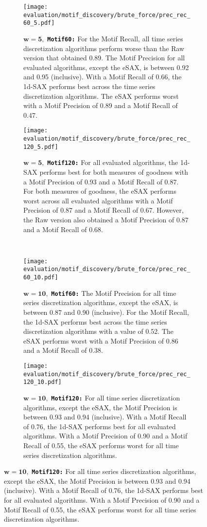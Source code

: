 \begin{figure}[H]
\centering
\begin{subfigure}[t]{0.45\textwidth}
\texttt{[image: evaluation/motif\_discovery/brute\_force/prec\_rec\_60\_5.pdf]}
\caption{$\mathbf{w = 5},$ \texttt{\textbf{Motif60:}} For the Motif Recall, all time series discretization algorithms perform worse than the Raw version that obtained 0.89. The Motif Precision for all evaluated algorithms, except the \ac{eSAX}, is between 0.92 and 0.95 (inclusive). With a Motif Recall of 0.66, the \ac{1d-SAX} performs best across the time series discretization algorithms. The \ac{eSAX} performs worst with a Motif Precision of 0.89 and a Motif Recall of 0.47.}
\label{fig:bf_60_10}
\end{subfigure}
\hfill%
\begin{subfigure}[t]{0.45\textwidth}
\texttt{[image: evaluation/motif\_discovery/brute\_force/prec\_rec\_120\_5.pdf]}
\caption{$\mathbf{w = 5},$ \texttt{\textbf{Motif120:}} For all evaluated algorithms, the \ac{1d-SAX} performs best for both measures of goodness with a Motif Precision of 0.93 and a Motif Recall of 0.87. For both measures of goodness, the \ac{eSAX} performs worst across all evaluated algorithms with a Motif Precision of 0.87 and a Motif Recall of 0.67. However, the Raw version also obtained a Motif Precision of 0.87 and a Motif Recall of 0.68.}
\label{fig:bf_120_5}
\end{subfigure}
\\[10pt]
\begin{subfigure}[t]{0.45\textwidth}
\texttt{[image: evaluation/motif\_discovery/brute\_force/prec\_rec\_60\_10.pdf]}
\caption{$\mathbf{w = 10},$ \texttt{\textbf{Motif60:}} The Motif Precision for all time series discretization algorithms, except the \ac{eSAX}, is between 0.87 and 0.90 (inclusive). For the Motif Recall, the \ac{1d-SAX} performs best across the time series discretization algorithms with a value of 0.52. The \ac{eSAX} performs worst with a Motif Precision of 0.86 and a Motif Recall of 0.38.}
\label{fig:bf_60_10}
\end{subfigure}
\hfill%
\begin{subfigure}[t]{0.45\textwidth}
\texttt{[image: evaluation/motif\_discovery/brute\_force/prec\_rec\_120\_10.pdf]}
\caption{$\mathbf{w = 10},$ \texttt{\textbf{Motif120:}} For all time series discretization algorithms, except the \ac{eSAX}, the Motif Precision is between 0.93 and 0.94 (inclusive). With a Motif Recall of 0.76, the \ac{1d-SAX} performs best for all evaluated algorithms. With a Motif Precision of 0.90 and a Motif Recall of 0.55, the \ac{eSAX} performs worst for all time series discretization algorithms.}

\end{subfigure}
\end{figure}
